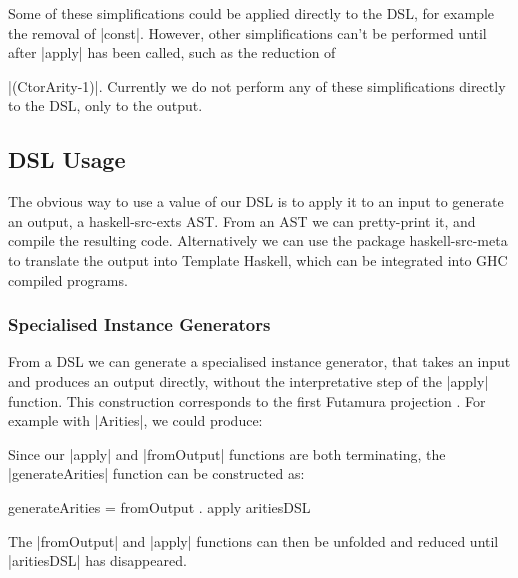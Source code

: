 \documentclass[preprint,draft]{sigplanconf}
\begin{document}
Some of these simplifications could be applied directly to the DSL, for example the removal of |const|. However, other simplifications can't be performed until after |apply| has been called, such as the reduction of \ignore|(CtorArity-1)|. Currently we do not perform any of these simplifications directly to the DSL, only to the output.

\subsection{DSL Usage}

The obvious way to use a value of our DSL is to apply it to an input to generate an output, a haskell-src-exts AST. From an AST we can pretty-print it, and compile the resulting code. Alternatively we can use the package haskell-src-meta \cite{haskell_src_meta} to translate the output into Template Haskell, which can be integrated into GHC compiled programs.

\subsubsection{Specialised Instance Generators}

From a DSL we can generate a specialised instance generator, that takes an input and produces an output directly, without the interpretative step of the |apply| function. This construction corresponds to the first Futamura projection \cite{futanama:projections}. For example with |Arities|, we could produce:


Since our |apply| and |fromOutput| functions are both terminating, the |generateArities| function can be constructed as:

\begin{code}
generateArities = fromOutput . apply aritiesDSL
\end{code}

The |fromOutput| and |apply| functions can then be unfolded and reduced until |aritiesDSL| has disappeared.
\end{document}
